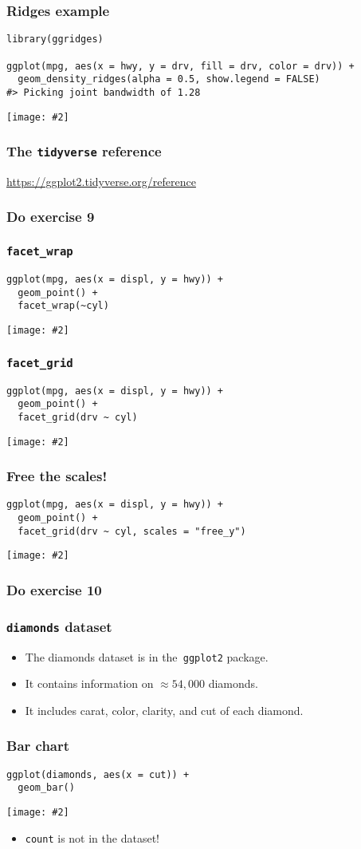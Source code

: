 \documentclass{beamer}
\newcommand{\bi}{\begin{itemize}}
\newcommand{\li}{\item}
\newcommand{\ei}{\end{itemize}}
\newcommand{\fig}[2]{\centerline{\texttt{[image: \#2]}}}
\newcommand{\bfr}[1]{\begin{frame}[fragile]\frametitle{{ #1 }}}
\begin{document}
\bfr{Ridges example}\scriptsize
\begin{verbatim}
library(ggridges)

ggplot(mpg, aes(x = hwy, y = drv, fill = drv, color = drv)) +
  geom_density_ridges(alpha = 0.5, show.legend = FALSE)
#> Picking joint bandwidth of 1.28
\end{verbatim}
\fig{1}{unnamed-chunk-17-1.png}
\end{frame}

\bfr{The {\tt tidyverse} reference}

\large\url{https://ggplot2.tidyverse.org/reference}
\end{frame}

\bfr{Do exercise 9}
\end{frame}

\bfr{\tt facet\_wrap}\scriptsize
\begin{verbatim}
ggplot(mpg, aes(x = displ, y = hwy)) + 
  geom_point() + 
  facet_wrap(~cyl)
\end{verbatim}
\fig{.8}{unnamed-chunk-20-1.png}
\end{frame}

\bfr{\tt facet\_grid}\scriptsize
\begin{verbatim}
ggplot(mpg, aes(x = displ, y = hwy)) + 
  geom_point() + 
  facet_grid(drv ~ cyl)
\end{verbatim}
\fig{.8}{unnamed-chunk-21-1.png}
\end{frame}


\bfr{Free the scales!}\scriptsize
\begin{verbatim}
ggplot(mpg, aes(x = displ, y = hwy)) + 
  geom_point() + 
  facet_grid(drv ~ cyl, scales = "free_y")
\end{verbatim}
\fig{.8}{unnamed-chunk-22-1.png}
\end{frame}

\bfr{Do exercise 10}
\end{frame}

\bfr{{\tt diamonds} dataset}
\bi
\li The diamonds dataset is in the\verb| ggplot2| package.
\li It contains information on 
$\approx 54,000$ diamonds.
\li It includes  carat, color, clarity, and cut of each diamond. 
\ei
\end{frame}

\bfr{Bar chart}
\begin{verbatim}
ggplot(diamonds, aes(x = cut)) + 
  geom_bar()
\end{verbatim}
\fig{.8}{unnamed-chunk-28-1.png}
\bi
\li \verb|count| is not in the dataset!
\ei
\end{frame}
\end{document}
